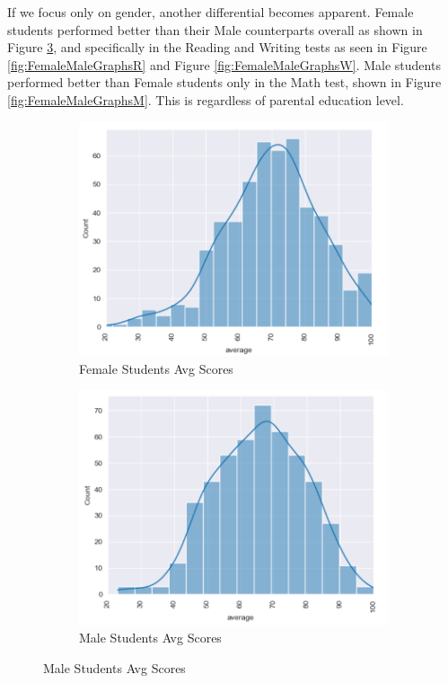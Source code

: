 \documentclass[doc]{apa6} %
\begin{document}
If we focus only on gender, another differential becomes apparent. Female students performed better than their Male counterparts overall as shown in Figure \ref{fig:FemaleMaleAvgScores}, and specifically in the Reading and Writing tests as seen in Figure \ref{fig:FemaleMaleGraphsR} and Figure \ref{fig:FemaleMaleGraphsW}.  Male students performed better than Female students only in the Math test, shown in Figure \ref{fig:FemaleMaleGraphsM}. This is regardless of parental education level.
\begin{figure}[H]
    \centering
    \caption{Average Standardized Scores by Gender}
    \begin{subfigure}[b]{0.45\textwidth}
        \includegraphics[width=\linewidth]{FemaleAverageScoreCurve.png}
        \caption{Female Students Avg Scores}
        \label{fig:FemaleAvg}
    \end{subfigure}
    \begin{subfigure}[b]{0.45\textwidth}
        \includegraphics[width=\linewidth]{MaleAverageScoreCurve.png}
        \caption{Male Students Avg Scores}
        \label{fig:MaleAvg}
    \end{subfigure}
    \label{fig:FemaleMaleAvgScores}
\end{figure}
\end{document}
